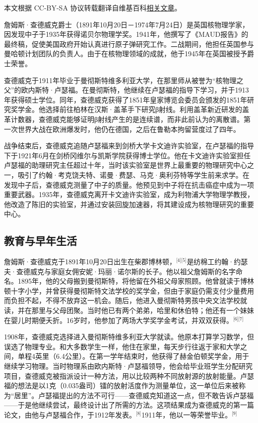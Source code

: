 
本文根据 CC-BY-SA 协议转载翻译自维基百科\href{https://en.wikipedia.org/wiki/James_Chadwick}{相关文章}。

詹姆斯·查德威克爵士（1891年10月20日－1974年7月24日）是英国核物理学家，因发现中子于1935年获得诺贝尔物理学奖。1941年，他撰写了《MAUD报告》的最终稿，促使美国政府开始认真进行原子弹研究工作。二战期间，他担任英国参与曼哈顿计划团队的负责人。由于在核物理领域的成就，他于1945年在英国被授予爵士荣誉。

查德威克于1911年毕业于曼彻斯特维多利亚大学，在那里师从被誉为“核物理之父”的欧内斯特·卢瑟福。在曼彻斯特，他继续在卢瑟福的指导下学习，并于1913年获得硕士学位。同年，查德威克获得了1851年皇家博览会委员会颁发的1851年研究奖学金。他选择前往柏林在汉斯·盖革手下研究β射线。利用盖革新近研发的盖革计数器，查德威克能够证明β射线产生的是连续谱，而非此前认为的离散谱。第一次世界大战在欧洲爆发时，他仍在德国，之后在鲁勒本拘留营度过了四年。

战争结束后，查德威克追随卢瑟福来到剑桥大学卡文迪许实验室，在卢瑟福的指导下于1921年6月在剑桥冈维尔与凯斯学院获得博士学位。他在卡文迪许实验室担任卢瑟福的助理研究主任超过十年，当时该实验室是世界上最重要的物理研究中心之一，吸引了约翰·考克饶夫特、诺曼·费瑟、马克·奥利芬特等学生前来求学。在发现中子后，查德威克测量了中子的质量。他预见到中子将在抗击癌症中成为一项重要武器。1935年，查德威克离开卡文迪许实验室，成为利物浦大学物理学教授，他改造了陈旧的实验室，并通过安装回旋加速器，将其建设成为核物理研究的重要中心。
\subsection{教育与早年生活}
詹姆斯·查德威克于1891年10月20日出生在柴郡博林顿，\(^\text{[4][5]}\)是纺棉工约翰·约瑟夫·查德威克与家庭女佣安妮·玛丽·诺尔斯的长子。他以祖父詹姆斯的名字命名。1895年，他的父母搬到曼彻斯特，将他留在外祖父母家照顾。他曾就读于博林顿十字小学，并曾获得曼彻斯特文法学校的奖学金，但由于家庭仍需支付少量费用而负担不起，不得不放弃这一机会。随后，他进入曼彻斯特男孩中央文法学校就读，并在那里与父母团聚。当时他已有两个弟弟，哈里和休伯特；他还有一个妹妹在婴儿时期便夭折。16岁时，他参加了两场大学奖学金考试，并双双获得。\(^\text{[6][7]}\)

1908年，查德威克选择进入曼彻斯特维多利亚大学就读。他原本打算学习数学，但误选了物理专业。和大多数学生一样，他住在家里，每天步行往返于家和大学之间，单程4英里（6.4公里）。在第一学年结束时，他获得了赫金伯顿奖学金，用于继续学习物理。当时物理系由欧内斯特·卢瑟福领导，他会给毕业班学生分配研究项目，查德威克被指派设计一种方法，用以比较两种不同放射源的放射能量。卢瑟福的想法是以1克（0.035盎司）镭的放射活度作为测量单位，这一单位后来被称为“居里”。卢瑟福提出的方法不可行——查德威克知道这一点，但不敢告诉卢瑟福——于是他继续尝试，最终设计出了所需的方法。这项结果成为查德威克的第一篇论文，由他与卢瑟福合作，于1912年发表。\(^\text{[8]}\)1911年，他以一等荣誉毕业。\(^\text{[9]}\)